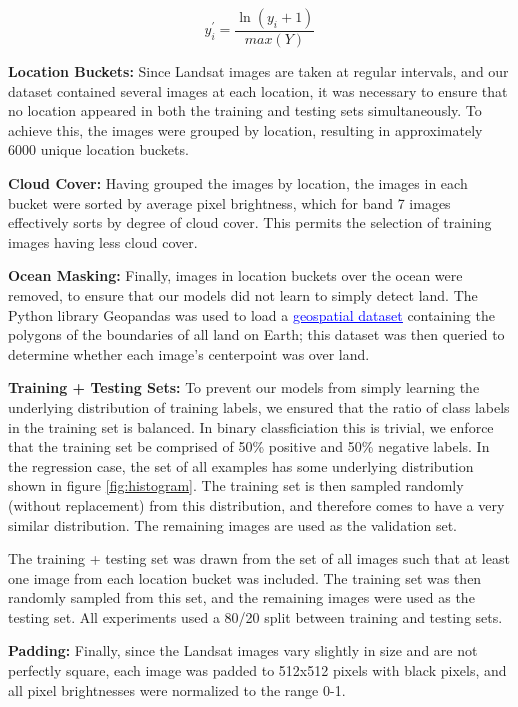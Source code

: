 \documentclass[10pt]{article}
\begin{document}
\begin{equation}
y^{\prime}_i = \frac{\ln(y_i + 1)}{max(Y)}
\end{equation}

\textbf{Location Buckets:}
Since Landsat images are taken at regular intervals,
and our dataset contained several images at each location, it was necessary to
ensure that no location appeared in both the training and testing sets simultaneously.
To achieve this, the images were grouped by location, resulting in approximately
6000 unique location buckets.

\textbf{Cloud Cover:}
Having grouped the images by location, the images in each bucket were sorted
by average pixel brightness, which for band 7 images effectively sorts by degree
of cloud cover. This permits the selection of training images having less cloud cover.

\textbf{Ocean Masking:}
Finally, images in location buckets over the ocean were removed, to ensure that our models
did not learn to simply detect land. The Python library Geopandas was used to load
a \href{https://www.naturalearthdata.com/}{\textcolor{blue}{\underline{geospatial dataset}}}
containing the polygons of the boundaries of all land on Earth; this dataset was
then queried to determine whether each image's centerpoint was over land.

\textbf{Training + Testing Sets:}
To prevent our models from simply learning the underlying distribution
of training labels, we ensured that the ratio of class labels in the training
set is balanced. In binary classficiation this is trivial, we enforce that
the training set be comprised of 50\% positive and 50\% negative labels. In
the regression case, the set of all examples has some underlying distribution
shown in figure \ref{fig:histogram}. The training set is then sampled randomly
(without replacement) from this distribution, and therefore comes to have a very
similar distribution. The remaining images are used as the validation set.

The training + testing set was drawn from the set of all images such that at least
one image from each location bucket was included. The training set was then
randomly sampled from this set, and the remaining images were used as the testing set.
All experiments used a 80/20 split between training and testing sets.

\textbf{Padding:}
Finally, since the Landsat images vary slightly in size and are not perfectly square,
each image was padded to 512x512 pixels with black pixels, and all pixel brightnesses
were normalized to the range 0-1. 
\end{document}
